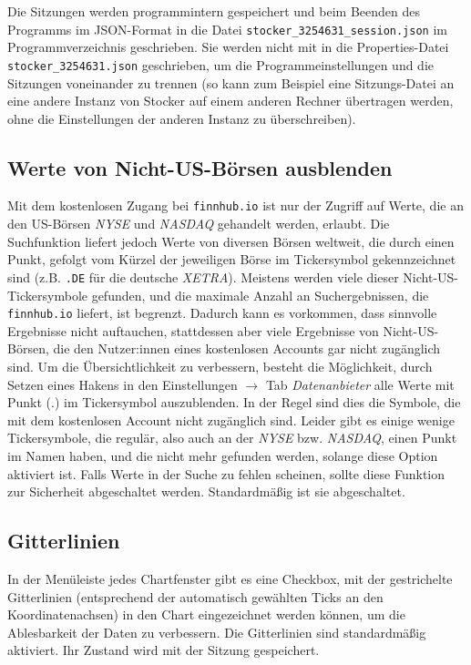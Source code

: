 \documentclass[fontsize=12pt, paper=a4, pagesize=auto, twoside=false, DIV=11, draft=false]{scrartcl}
\begin{document}
Die Sitzungen werden programmintern gespeichert und beim Beenden des Programms im JSON-Format in die Datei \texttt{stocker\_3254631\_session.json} im Programmverzeichnis geschrieben. Sie werden nicht mit in die Properties-Datei \texttt{stocker\-\_3254631.json} geschrieben, um die Programmeinstellungen und die Sitzungen voneinander zu trennen (so kann zum Beispiel eine Sitzungs-Datei an eine andere Instanz von Stocker auf einem anderen Rechner übertragen werden, ohne die Einstellungen der anderen Instanz zu überschreiben). 

\subsection{Werte von Nicht-US-Börsen ausblenden}
Mit dem kostenlosen Zugang bei \texttt{finnhub.io} ist nur der Zugriff auf Werte, die an den US-Börsen \textit{NYSE} und \textit{NASDAQ} gehandelt werden, erlaubt. Die Suchfunktion liefert jedoch Werte von diversen Börsen weltweit, die durch einen Punkt, gefolgt vom Kürzel der jeweiligen Börse im Tickersymbol gekennzeichnet sind (z.B. \texttt{.DE} für die deutsche \textit{XETRA}). Meistens werden viele dieser Nicht-US-Tickersymbole gefunden, und die maximale Anzahl an Suchergebnissen, die \texttt{finnhub.io} liefert, ist begrenzt. Dadurch kann es vorkommen, dass sinnvolle Ergebnisse nicht auftauchen, stattdessen aber viele Ergebnisse von Nicht-US-Börsen, die den Nutzer:innen eines kostenlosen Accounts gar nicht zugänglich sind. Um die Übersichtlichkeit zu verbessern, besteht die Möglichkeit, durch Setzen eines Hakens in den Einstellungen $\rightarrow$ Tab \textit{Datenanbieter} alle Werte mit Punkt (.) im Tickersymbol auszublenden. In der Regel sind dies die Symbole, die mit dem kostenlosen Account nicht zugänglich sind. Leider gibt es einige wenige Tickersymbole, die regulär, also auch an der \textit{NYSE} bzw. \textit{NASDAQ}, einen Punkt im Namen haben, und die nicht mehr gefunden werden, solange diese Option aktiviert ist. Falls Werte in der Suche zu fehlen scheinen, sollte diese Funktion zur Sicherheit abgeschaltet werden. Standardmäßig ist sie abgeschaltet.

\subsection{Gitterlinien}
In der Menüleiste jedes Chartfenster gibt es eine Checkbox, mit der gestrichelte Gitterlinien (entsprechend der automatisch gewählten Ticks an den Koordinatenachsen) in den Chart eingezeichnet werden können, um die Ablesbarkeit der Daten zu verbessern. Die Gitterlinien sind standardmäßig aktiviert. Ihr Zustand wird mit der Sitzung gespeichert.
\end{document}
